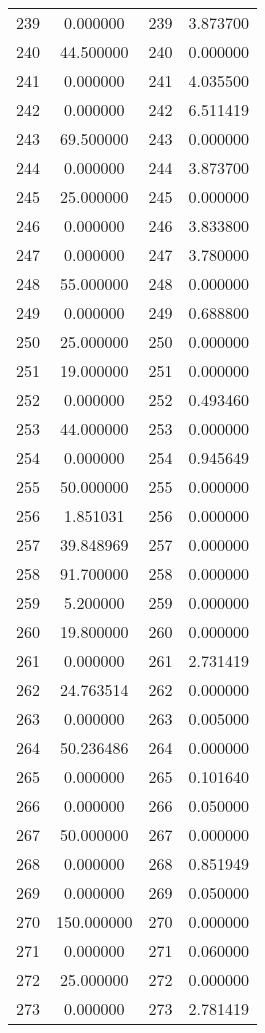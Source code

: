 \documentclass[12pt]{article}
\begin{document}
\begin{longtable}{@{}cccc@{}}
239 & 0.000000 & 239 & 3.873700 \\
240 & 44.500000 & 240 & 0.000000 \\
241 & 0.000000 & 241 & 4.035500 \\
242 & 0.000000 & 242 & 6.511419 \\
243 & 69.500000 & 243 & 0.000000 \\
244 & 0.000000 & 244 & 3.873700 \\
245 & 25.000000 & 245 & 0.000000 \\
246 & 0.000000 & 246 & 3.833800 \\
247 & 0.000000 & 247 & 3.780000 \\
248 & 55.000000 & 248 & 0.000000 \\
249 & 0.000000 & 249 & 0.688800 \\
250 & 25.000000 & 250 & 0.000000 \\
251 & 19.000000 & 251 & 0.000000 \\
252 & 0.000000 & 252 & 0.493460 \\
253 & 44.000000 & 253 & 0.000000 \\
254 & 0.000000 & 254 & 0.945649 \\
255 & 50.000000 & 255 & 0.000000 \\
256 & 1.851031 & 256 & 0.000000 \\
257 & 39.848969 & 257 & 0.000000 \\
258 & 91.700000 & 258 & 0.000000 \\
259 & 5.200000 & 259 & 0.000000 \\
260 & 19.800000 & 260 & 0.000000 \\
261 & 0.000000 & 261 & 2.731419 \\
262 & 24.763514 & 262 & 0.000000 \\
263 & 0.000000 & 263 & 0.005000 \\
264 & 50.236486 & 264 & 0.000000 \\
265 & 0.000000 & 265 & 0.101640 \\
266 & 0.000000 & 266 & 0.050000 \\
267 & 50.000000 & 267 & 0.000000 \\
268 & 0.000000 & 268 & 0.851949 \\
269 & 0.000000 & 269 & 0.050000 \\
270 & 150.000000 & 270 & 0.000000 \\
271 & 0.000000 & 271 & 0.060000 \\
272 & 25.000000 & 272 & 0.000000 \\
273 & 0.000000 & 273 & 2.781419 \\

\end{longtable}
\end{document}
